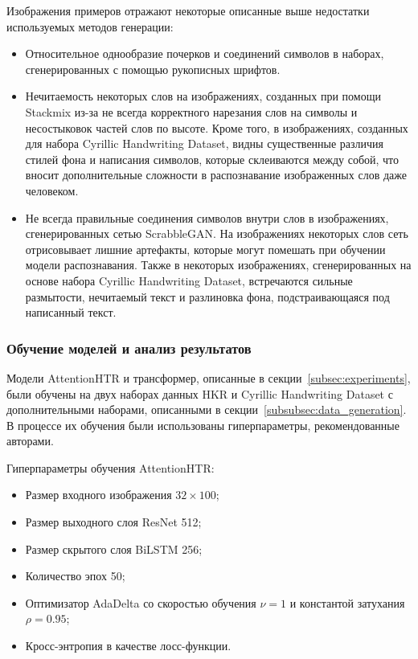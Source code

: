 Изображения примеров отражают некоторые описанные выше недостатки используемых методов генерации:
\begin{itemize}
    \item Относительное однообразие почерков и соединений символов в наборах, сгенерированных с помощью рукописных шрифтов.
    \item Нечитаемость некоторых слов на изображениях, созданных при помощи Stackmix из-за не всегда корректного нарезания
    слов на символы и несостыковок частей слов по высоте.
    Кроме того, в изображениях, созданных для набора Cyrillic Handwriting Dataset, видны существенные различия стилей фона и написания символов,
    которые склеиваются между собой, что вносит дополнительные сложности в распознавание изображенных слов даже человеком.
    \item Не всегда правильные соединения символов внутри слов в изображениях, сгенерированных сетью ScrabbleGAN.
    На изображениях некоторых слов сеть отрисовывает лишние артефакты, которые могут помешать при обучении модели распознавания.
    Также в некоторых изображениях, сгенерированных на основе набора Cyrillic Handwriting Dataset, встречаются сильные размытости, нечитаемый текст и
    разлиновка фона, подстраивающаяся под написанный текст.
\end{itemize}


\subsubsection{Обучение моделей и анализ результатов}
\label{subsubsec:experiments_results}

Модели AttentionHTR и трансформер, описанные в секции~\ref{subsec:experiments}, были обучены на двух наборах данных HKR и Cyrillic Handwriting Dataset с
дополнительными наборами, описанными в секции~\ref{subsubsec:data_generation}.
В процессе их обучения были использованы гиперпараметры, рекомендованные авторами.

Гиперпараметры обучения AttentionHTR:
\begin{itemize}
    \item Размер входного изображения $32 \times 100$;
    \item Размер выходного слоя ResNet 512;
    \item Размер скрытого слоя BiLSTM 256;
    \item Количество эпох 50;
    \item Оптимизатор AdaDelta со скоростью обучения $\nu=1$ и константой затухания $\rho=0.95$;
    \item Кросс-энтропия в качестве лосс-функции.
\end{itemize}

